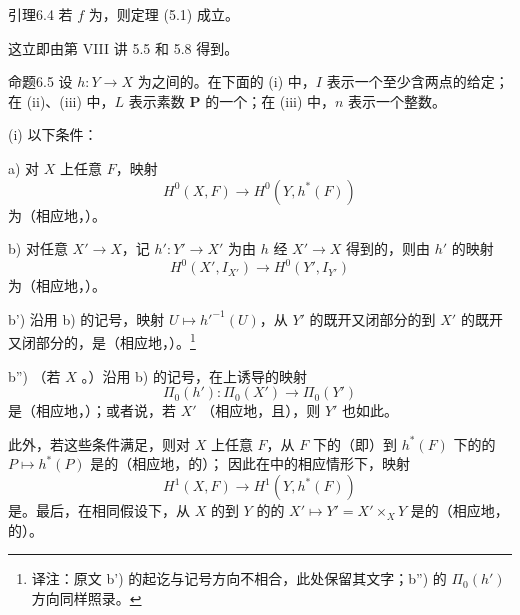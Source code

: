 \begin{SGAresult}{引理}{6.4}
若 $f$ 为，则定理 (5.1) 成立。
\end{SGAresult}
这立即由第 VIII 讲 5.5 和 5.8 得到。

\begin{SGAresult}{命题}{6.5}
设 $h:Y\to X$ 为之间的。在下面的 (i) 中，$I$ 表示一个至少含两点的给定；在 (ii)、(iii) 中，$L$ 表示素数 $\mathbf P$ 的一个；在 (iii) 中，$n$ 表示一个整数。

(i) 以下条件：

 a) 对 $X$ 上任意 $F$，映射
\[
H^0(X,F)\longrightarrow H^0(Y,h^*(F))
\]
为（相应地，）。

 b) 对任意 $X'\to X$，记 $h':Y'\to X'$ 为由 $h$ 经 $X'\to X$ 得到的，则由 $h'$ 的映射
\[
H^0(X',I_{X'})\longrightarrow H^0(Y',I_{Y'})
\]
为（相应地，）。

 b') 沿用 b) 的记号，映射 $U\mapsto h'^{-1}(U)$，从 $Y'$ 的既开又闭部分的到 $X'$ 的既开又闭部分的，是（相应地，）。\footnote{译注：原文 b') 的起讫与记号方向不相合，此处保留其文字；b'') 的 $\Pi_0(h')$ 方向同样照录。}

 b'') （若 $X$ 。）沿用 b) 的记号，在上诱导的映射
\[
\Pi_0(h'):\Pi_0(X')\longrightarrow\Pi_0(Y')
\]
是（相应地，）；或者说，若 $X'$ （相应地，且），则 $Y'$ 也如此。

此外，若这些条件满足，则对 $X$ 上任意 $F$，从 $F$ 下的（即）到 $h^*(F)$ 下的的 $P\mapsto h^*(P)$ 是的（相应地，的）；
因此在中的相应情形下，映射
\[
H^1(X,F)\longrightarrow H^1(Y,h^*(F))
\]
是。最后，在相同假设下，从 $X$ 的到 $Y$ 的的 $X'\mapsto Y'=X'\times_XY$ 是的（相应地，的）。


\end{SGAresult}
